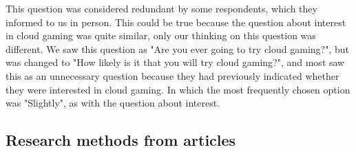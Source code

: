 This question was considered redundant by some respondents, which they informed to us in person. This could be true because the question about interest in cloud gaming was quite similar, only our thinking on this question was different. We saw this question as "Are you ever going to try cloud gaming?", but was changed to "How likely is it that you will try cloud gaming?", and most saw this as an unnecessary question because they had previously indicated whether they were interested in cloud gaming. In which the most frequently chosen option was "Slightly", as with the question about interest.
\\
\subsection{Research methods from articles}


